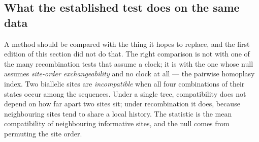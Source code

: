\subsection{What the established test does on the same data}\label{sub:headtohead}

A method should be compared with the thing it hopes to replace, and the first
edition of this section did not do that. The right comparison is not with one of
the many recombination tests that assume a clock; it is with the one whose null
assumes \emph{site-order exchangeability} and no clock at all --- the pairwise
homoplasy index. Two biallelic sites are \emph{incompatible} when all four
combinations of their states occur among the sequences. Under a single tree,
compatibility does not depend on how far apart two sites sit; under
recombination it does, because neighbouring sites tend to share a local history.
The statistic is the mean compatibility of neighbouring informative sites, and
the null comes from permuting the site order.

